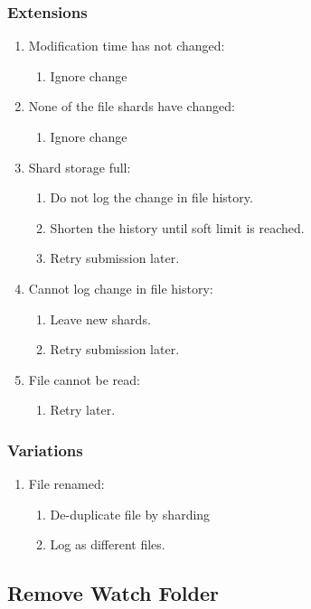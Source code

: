 \documentclass[11pt, a4paper, twocolumn, twoside]{report}
\begin{document}
\subsubsection{Extensions}
\begin{enumerate}
  \item Modification time has not changed:
	\begin{enumerate}
	  \item Ignore change
	\end{enumerate}
  \item None of the file shards have changed:
	\begin{enumerate}
	  \item Ignore change
	\end{enumerate}
  \item Shard storage full:
	\begin{enumerate}
	  \item Do not log the change in file history.
	  \item Shorten the history until soft limit is reached.
	  \item Retry submission later.
	\end{enumerate}
  \item Cannot log change in file history:
	\begin{enumerate}
	  \item Leave new shards.
	  \item Retry submission later.
	\end{enumerate}
  \item File cannot be read:
	\begin{enumerate}
	  \item Retry later.
	\end{enumerate}
\end{enumerate}

\subsubsection{Variations}
\begin{enumerate}
  \item File renamed:
	\begin{enumerate}
	  \item De-duplicate file by sharding
	  \item Log as different files.
	\end{enumerate}
\end{enumerate}

\subsection{Remove Watch Folder}
\end{document}
